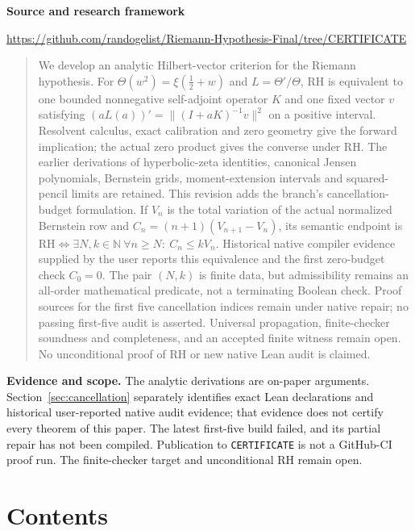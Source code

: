 \documentclass[11pt,a4paper]{article}
\numberwithin{equation}{section}
\theoremstyle{definition}
\theoremstyle{remark}
\newcommand{\N}{\mathbb N}
\newcommand{\RH}{\mathrm{RH}}
\begin{document}
\vspace{10pt}
{\small\color{linkblue}\textbf{Source and research framework}\par
\url{https://github.com/randogelist/Riemann-Hypothesis-Final/tree/CERTIFICATE}}
\clearpage
\begin{abstract}
We develop an analytic Hilbert-vector criterion for the Riemann hypothesis.
For $\Theta(w^2)=\xi(\tfrac12+w)$ and $L=\Theta'/\Theta$, RH is equivalent
to one bounded nonnegative self-adjoint operator $K$ and one fixed vector
$v$ satisfying $(aL(a))'=\|(I+aK)^{-1}v\|^2$ on a positive interval.
Resolvent calculus, exact calibration and zero geometry give the forward
implication; the actual zero product gives the converse under RH.
The earlier derivations of hyperbolic-zeta identities, canonical Jensen
polynomials, Bernstein grids, moment-extension intervals and squared-pencil
limits are retained. This revision adds the branch's cancellation-budget
formulation. If $V_n$ is the total variation of the actual normalized
Bernstein row and $C_n=(n+1)(V_{n+1}-V_n)$, its semantic endpoint is
$\RH\Longleftrightarrow\exists N,k\in\N\ \forall n\ge N:\ C_n\le kV_n$.
Historical native compiler evidence supplied by the user reports this
equivalence and the first zero-budget check $C_0=0$.
The pair $(N,k)$ is finite data, but admissibility remains an all-order
mathematical predicate, not a terminating Boolean check. Proof sources for
the first five cancellation indices remain under native repair; no passing
first-five audit is asserted. Universal propagation, finite-checker
soundness and completeness, and an accepted finite witness remain open.
No unconditional proof of RH or new native Lean audit is claimed.
\end{abstract}
\begin{scopebox}
\small\textbf{Evidence and scope.} The analytic derivations are on-paper
arguments. Section~\ref{sec:cancellation} separately identifies exact Lean
declarations and historical user-reported native audit evidence; that
evidence does not certify every theorem of this paper. The latest first-five
build failed, and its partial repair has not been compiled. Publication to
\texttt{CERTIFICATE} is not a GitHub-CI proof run. The finite-checker target
and unconditional RH remain open.
\end{scopebox}
\vspace{5pt}
\section*{Contents}
\setlength{\multicolsep}{2pt}
\begin{multicols}{2}
\footnotesize\setlength{\parskip}{0pt}
\makeatletter{}\makeatother
\end{multicols}
\clearpage
\end{document}
